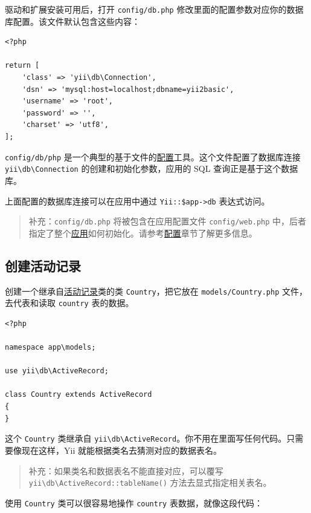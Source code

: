 驱动和扩展安装可用后，打开 \lstinline|config/db.php| 修改里面的配置参数对应你的数据库配置。该文件默认包含这些内容：

\lstset{language=php}\begin{lstlisting}
<?php

return [
    'class' => 'yii\db\Connection',
    'dsn' => 'mysql:host=localhost;dbname=yii2basic',
    'username' => 'root',
    'password' => '',
    'charset' => 'utf8',
];
\end{lstlisting}
\lstinline|config/db/php| 是一个典型的基于文件的\hyperref[concept-configurations.md]{配置}工具。这个文件配置了数据库连接 \texttt{yii{\allowbreak{}\textbackslash}db{\allowbreak{}\textbackslash}Connection} 的创建和初始化参数，应用的 SQL 查询正是基于这个数据库。

上面配置的数据库连接可以在应用中通过 \lstinline|Yii::$app->db| 表达式访问。

\begin{quote}补充：\lstinline|config/db.php| 将被包含在应用配置文件 \lstinline|config/web.php| 中，后者指定了整个\hyperref[structure-applications.md]{应用}如何初始化。请参考\hyperref[concept-configurations.md]{配置}章节了解更多信息。

\end{quote}
\subsection{创建活动记录 \label{start-databases.md::creating-active-record}}
创建一个继承自\hyperref[db-active-record.md]{活动记录}类的类 \lstinline|Country|，把它放在 \lstinline|models/Country.php| 文件，去代表和读取 \lstinline|country| 表的数据。

\lstset{language=php}\begin{lstlisting}
<?php

namespace app\models;

use yii\db\ActiveRecord;

class Country extends ActiveRecord
{
}
\end{lstlisting}
这个 \lstinline|Country| 类继承自 \texttt{yii{\allowbreak{}\textbackslash}db{\allowbreak{}\textbackslash}ActiveRecord}。你不用在里面写任何代码。只需要像现在这样，Yii 就能根据类名去猜测对应的数据表名。

\begin{quote}补充：如果类名和数据表名不能直接对应，可以覆写 \texttt{yii{\allowbreak{}\textbackslash}db{\allowbreak{}\textbackslash}ActiveRecord\allowbreak{}::\allowbreak{}tableName()} 方法去显式指定相关表名。

\end{quote}
使用 \lstinline|Country| 类可以很容易地操作 \lstinline|country| 表数据，就像这段代码：

